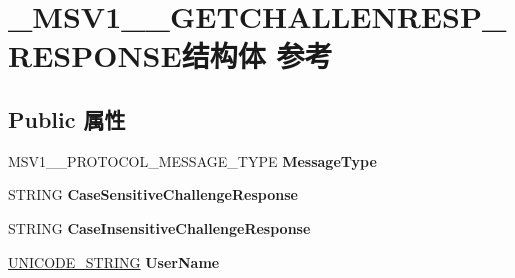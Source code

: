 \hypertarget{struct___m_s_v1__0___g_e_t_c_h_a_l_l_e_n_r_e_s_p___r_e_s_p_o_n_s_e}{}\section{\+\_\+\+M\+S\+V1\+\_\+\_\+\+G\+E\+T\+C\+H\+A\+L\+L\+E\+N\+R\+E\+S\+P\+\_\+\+R\+E\+S\+P\+O\+N\+S\+E结构体 参考}
\label{struct___m_s_v1__0___g_e_t_c_h_a_l_l_e_n_r_e_s_p___r_e_s_p_o_n_s_e}
\subsection*{Public 属性}
\begin{DoxyCompactItemize}
\item 
\mbox{\label{struct___m_s_v1__0___g_e_t_c_h_a_l_l_e_n_r_e_s_p___r_e_s_p_o_n_s_e_afffa46c685c357cbe5434a7a2687c28d}} 
M\+S\+V1\+\_\+\_\+\+P\+R\+O\+T\+O\+C\+O\+L\+\_\+\+M\+E\+S\+S\+A\+G\+E\+\_\+\+T\+Y\+PE {\bfseries Message\+Type}
\item 
\mbox{\label{struct___m_s_v1__0___g_e_t_c_h_a_l_l_e_n_r_e_s_p___r_e_s_p_o_n_s_e_abbd41f4152de02bed55065ab05a40173}} 
S\+T\+R\+I\+NG {\bfseries Case\+Sensitive\+Challenge\+Response}
\item 
\mbox{\label{struct___m_s_v1__0___g_e_t_c_h_a_l_l_e_n_r_e_s_p___r_e_s_p_o_n_s_e_a994ba67c46e6242dcd6ac26254d1df87}} 
S\+T\+R\+I\+NG {\bfseries Case\+Insensitive\+Challenge\+Response}
\item 
\mbox{\label{struct___m_s_v1__0___g_e_t_c_h_a_l_l_e_n_r_e_s_p___r_e_s_p_o_n_s_e_afb07f1790ab8265f68e30458e9316995}} 
\hyperlink{struct___u_n_i_c_o_d_e___s_t_r_i_n_g}{U\+N\+I\+C\+O\+D\+E\+\_\+\+S\+T\+R\+I\+NG} {\bfseries User\+Name}
\item 
\mbox{\label{struct___m_s_v1__0___g_e_t_c_h_a_l_l_e_n_r_e_s_p___r_e_s_p_o_n_s_e_a5a3ef5d216f5dde5685300099690ff7c}} 

\end{DoxyCompactItemize}

